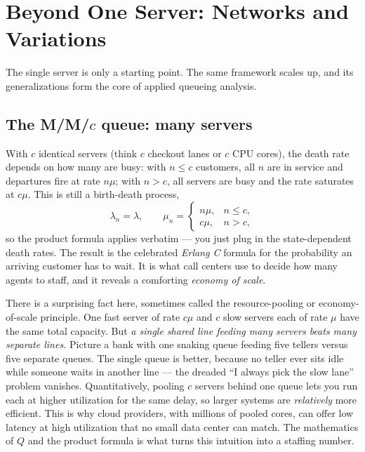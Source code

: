 \section{Beyond One Server: Networks and Variations}
\label{ch27:networks}

The single server is only a starting point. The same framework scales up, and its generalizations
form the core of applied queueing analysis.

\subsection{The M/M/$c$ queue: many servers}

With $c$ identical servers (think $c$ checkout lanes or $c$ CPU cores), the death rate depends on how
many are busy: with $n \le c$ customers, all $n$ are in service and departures fire at rate $n\mu$;
with $n > c$, all servers are busy and the rate saturates at $c\mu$. This is still a birth-death
process,
\[
  \lambda_n = \lambda, \qquad
  \mu_n = \begin{cases} n\mu, & n \le c, \\ c\mu, & n > c, \end{cases}
\]
so the product formula applies verbatim --- you just plug in the state-dependent death rates. The
result is the celebrated \emph{Erlang C} formula for the probability an arriving customer has to
wait. It is what call centers use to decide how many agents to staff, and it reveals a comforting
\emph{economy of scale}.

\begin{aestheticbox}
There is a surprising fact here, sometimes called the resource-pooling or economy-of-scale
principle. One fast server of rate $c\mu$ and $c$ slow servers each of rate $\mu$ have the same total
capacity. But \emph{a single shared line feeding many servers beats many separate lines.} Picture a
bank with one snaking queue feeding five tellers versus five separate queues. The single queue is
better, because no teller ever sits idle while someone waits in another line --- the dreaded
``I always pick the slow lane'' problem vanishes. Quantitatively, pooling $c$ servers behind one
queue lets you run each at higher utilization for the same delay, so larger systems are
\emph{relatively} more efficient. This is why cloud providers, with millions of pooled cores, can
offer low latency at high utilization that no small data center can match. The mathematics of $Q$ and
the product formula is what turns this intuition into a staffing number.
\end{aestheticbox}

